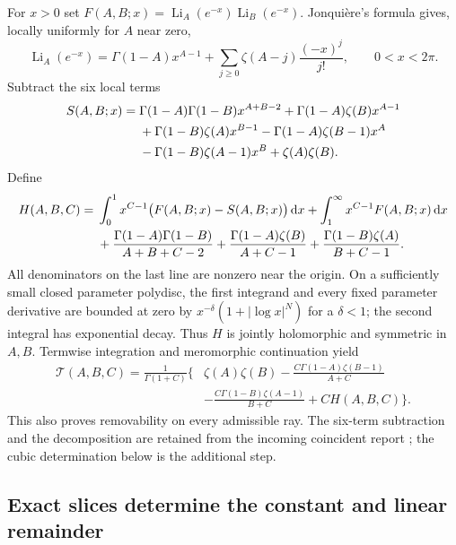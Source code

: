 \documentclass[11pt]{article}
\numberwithin{equation}{section}
\theoremstyle{definition}
\theoremstyle{remark}
\newcommand{\Li}{\operatorname{Li}}
\newcommand{\T}{\mathcal T}
\newcommand{\dd}{\,\mathrm d}
\begin{document}
For $x>0$ set $F(A,B;x)=\Li_A(e^{-x})\Li_B(e^{-x})$.
Jonqui\`ere's formula gives, locally uniformly for $A$ near zero,
\begin{equation}\label{ray:Jonquiere}
 \Li_A(e^{-x})=\Gamma(1-A)x^{A-1}
       +\sum_{j\ge0}\zeta(A-j)\frac{(-x)^j}{j!},\qquad 0<x<2\pi.
\end{equation}
Subtract the six local terms
\begin{align}
 S(A,B;x)={}&\Gamma(1-A)\Gamma(1-B)x^{A+B-2}
 +\Gamma(1-A)\zeta(B)x^{A-1}\notag\\
 &+\Gamma(1-B)\zeta(A)x^{B-1}
 -\Gamma(1-A)\zeta(B-1)x^A\notag\\
 &-\Gamma(1-B)\zeta(A-1)x^B+\zeta(A)\zeta(B).
 \label{ray:S}
\end{align}
Define
\begin{align}
 H(A,B,C)={}&\int_0^1x^{C-1}\bigl(F(A,B;x)-S(A,B;x)\bigr)\dd x
       +\int_1^\infty x^{C-1}F(A,B;x)\dd x\notag\\
 &+\frac{\Gamma(1-A)\Gamma(1-B)}{A+B+C-2}
 +\frac{\Gamma(1-A)\zeta(B)}{A+C-1}
 +\frac{\Gamma(1-B)\zeta(A)}{B+C-1}.
 \label{ray:H}
\end{align}
All denominators on the last line are nonzero near the origin.
On a sufficiently small closed parameter polydisc, the first integrand
and every fixed parameter derivative are bounded at zero by
$x^{-\delta}(1+|\log x|^N)$ for a $\delta<1$; the second integral
has exponential decay. Thus $H$ is jointly holomorphic and symmetric
in $A,B$. Termwise integration and meromorphic continuation yield
\begin{equation}\label{ray:decomposition}
 \begin{split}
 \T(A,B,C)=\frac1{\Gamma(1+C)}\biggl\{&\zeta(A)\zeta(B)
 -\frac{C\Gamma(1-A)\zeta(B-1)}{A+C}\\
 &-\frac{C\Gamma(1-B)\zeta(A-1)}{B+C}
 +CH(A,B,C)\biggr\}.
 \end{split}
\end{equation}
This also proves removability on every admissible ray. The six-term
subtraction and the decomposition are retained from the incoming
coincident report \cite{IncomingCoincident}; the cubic determination
below is the additional step.

\subsection{Exact slices determine the constant and linear remainder}
\end{document}
